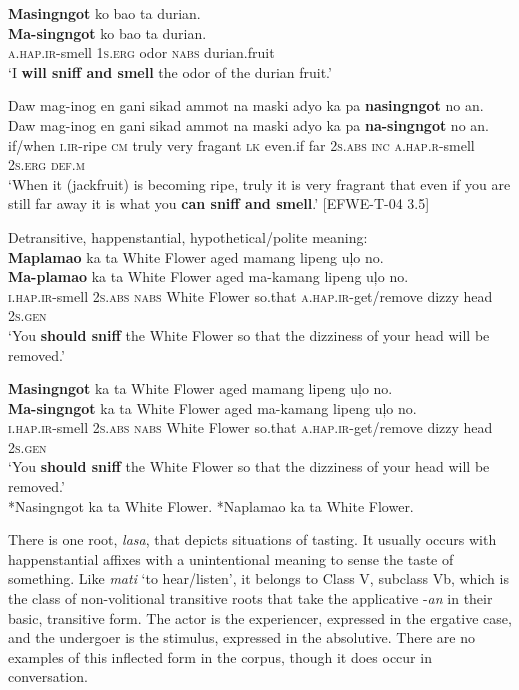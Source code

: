 \ea
\textbf{Masingngot}  ko  bao  ta  durian. \\\smallskip
\gll \textbf{Ma-singngot}  ko  bao  ta  durian. \\
\textsc{a.hap.ir}-smell  1\textsc{s.erg}  odor  \textsc{nabs}  durian.fruit \\
\glt ‘I \textbf{will sniff and smell} the odor of the durian fruit.'
\z

\ea
Daw  mag-inog  en  gani  sikad  ammot  na  maski   adyo  ka  pa \textbf{nasingngot}  no  an. \\\smallskip
\gll Daw  mag-inog  en  gani  sikad  ammot  na  maski   adyo  ka  pa \textbf{na-singngot}  no  an. \\
if/when  \textsc{i.ir}-ripe  \textsc{cm}  truly  very  fragant  \textsc{lk}  even.if  far  2\textsc{s.abs}  \textsc{inc} \textsc{a.hap.r}-smell  2\textsc{s.erg}  \textsc{def.m} \\
\glt `When it (jackfruit) is becoming ripe, truly it is very fragrant that even if you are still far away it is what you \textbf{can sniff and smell}.’ [EFWE-T-04 3.5]
\z

\ea
Detransitive, happenstantial, hypothetical/polite meaning: \\
\textbf{Maplamao}  ka  ta  White Flower  aged  mamang lipeng uļo  no. \\\smallskip
\gll \textbf{Ma-plamao}  ka  ta  White Flower  aged  ma-kamang lipeng uļo  no. \\
\textsc{i.hap.ir}-smell  2\textsc{s.abs}  \textsc{nabs}  White Flower  so.that  \textsc{a.hap.ir}-get/remove  dizzy head  2\textsc{s.gen} \\
\glt ‘You \textbf{should sniff} the White Flower so that the dizziness of your head will be removed.’
\z

\newpage
\ea
\textbf{Masingngot}  ka  ta  White Flower  aged  mamang lipeng uļo  no. \\\smallskip
\gll \textbf{Ma-singngot}  ka  ta  White Flower  aged  ma-kamang lipeng uļo  no. \\
\textsc{i.hap.ir}-smell  2\textsc{s.abs}  \textsc{nabs}  White Flower  so.that \textsc{a.hap.ir}-get/remove  dizzy head  2\textsc{s.gen} \\
\glt `You \textbf{should sniff} the White Flower so that the dizziness of your head will be removed.’\\\smallskip
*Nasingngot ka ta White Flower.    *Naplamao ka ta White Flower.
\z

There is one root, \textit{lasa}, that depicts situations of tasting. It usually occurs with happenstantial affixes with a unintentional meaning to sense the taste of something. Like \textit{mati} ‘to hear/listen’, it belongs to Class V, subclass Vb, which is the class of non-volitional transitive roots that take the applicative -\textit{an} in their basic, transitive form. The actor is the experiencer, expressed in the ergative case, and the undergoer is the stimulus, expressed in the absolutive. There are no examples of this inflected form in the corpus, though it does occur in conversation.

